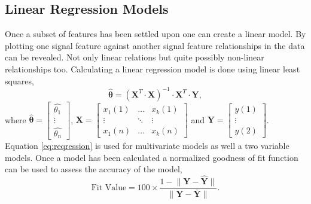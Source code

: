\documentclass[]{article}
\begin{document}

\subsection{Linear Regression Models}
Once a subset of features has been settled upon one can create a linear model. By plotting one signal feature against another signal feature relationships in the data can be revealed. Not only linear relations but quite possibly non-linear relationships too. Calculating a linear regression model is done using linear least squares, 
\begin{equation} \label{eq:reqression}
	\hat{\boldsymbol{\theta}} = (\mathbf{X}^T \cdot \mathbf{X})^{-1} \cdot \mathbf{X}^T \cdot \mathbf{Y},
\end{equation}
where $ \hat{\boldsymbol{\theta}} = \begin{bmatrix} \hat{\theta_{1}} \\ \vdots \\ \hat{\theta_{n}} \end{bmatrix} $, $ \mathbf{X} = \begin{bmatrix} x_{1}(1) & \hdots & x_{k}(1) \\ \vdots & \ddots & \vdots \\ x_{1}(n) & \hdots & x_{k}(n)  \end{bmatrix}$ and 
$ \mathbf{Y} = \begin{bmatrix} y(1) \\ \vdots \\ y(2)\end{bmatrix}$.\\
Equation \ref{eq:reqression} is used for multivariate models as well a two variable models. Once a model has been calculated a normalized goodness of fit function can be used to assess the accuracy of the model,
\begin{equation}
	\textrm{Fit Value} = 100 \times \frac{ 1 - \lVert\mathbf{Y} - \mathbf{\hat{Y}}\rVert } { \lVert \mathbf{Y} - \mathbf{\bar{Y}} \rVert }.
\end{equation}
\end{document}
